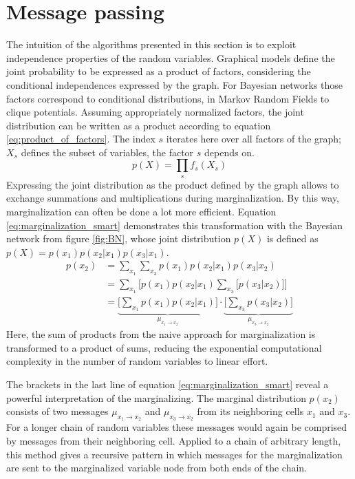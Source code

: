 \documentclass{sigkdd}
\begin{document}
\section{Message passing}\label{chapter:exact_inference}
The intuition of the algorithms presented in this section is to exploit independence properties of the random variables. Graphical models define the joint probability to be expressed as a product of factors, considering the conditional independences expressed by the graph. For Bayesian networks those factors correspond to conditional distributions, in Markov Random Fields to clique potentials. Assuming appropriately normalized factors, the joint distribution can be written as a product according to equation \ref{eq:product_of_factors}. The index $s$ iterates here over all factors of the graph; $X_s$ defines the subset of variables, the factor $s$ depends on.
\begin{equation}\label{eq:product_of_factors}
p(X)= \prod_{s} f_s(X_s)
\end{equation}
Expressing the joint distribution as the product defined by the graph allows to exchange summations and multiplications during marginalization. By this way, marginalization can often be done a lot more efficient. Equation \ref{eq:marginalization_smart} demonstrates this transformation with the Bayesian network from figure \ref{fig:BN}, whose joint distribution $p(X)$ is defined as $p(X) =  p(x_1) p(x_2|x_1) p(x_3|x_1)$.
\begin{equation}\label{eq:marginalization_smart}
\begin{split}
p(x_2) &= \sum_{x_1} \sum_{x_3} p(x_1) p(x_2|x_1) p(x_3|x_2) \\ &= \sum_{x_1} \Big[  p(x_1) p(x_2|x_1) \sum_{x_3} \Big[ p(x_3|x_2)\Big] \Big] \\ &= \underbrace{\Big[ \sum_{x_1}  p(x_1) p(x_2|x_1)\Big]}_{\mu_{x_1 \rightarrow x_2}}\cdot \underbrace{\Big[ \sum_{x_3}  p(x_3|x_2)\Big]}_{\mu_{x_3 \rightarrow x_2}}
\end{split}
\end{equation}
Here, the sum of products from the naive approach for marginalization is transformed to a product of sums, reducing the exponential computational complexity in the number of random variables to linear effort.

The brackets in the last line of equation \ref{eq:marginalization_smart} reveal a powerful interpretation of the marginalizing. The marginal distribution $p(x_2)$ consists of two messages $\mu_{x_1 \rightarrow x_2}$ and $\mu_{x_3 \rightarrow x_2}$ from its neighboring cells $x_1$ and $x_3$. For a longer chain of random variables these messages would again be comprised by messages from their neighboring cell. Applied to a chain of arbitrary length, this method gives a recursive pattern in which messages for the marginalization are sent to the marginalized variable node from both ends of the chain.  
\end{document}

